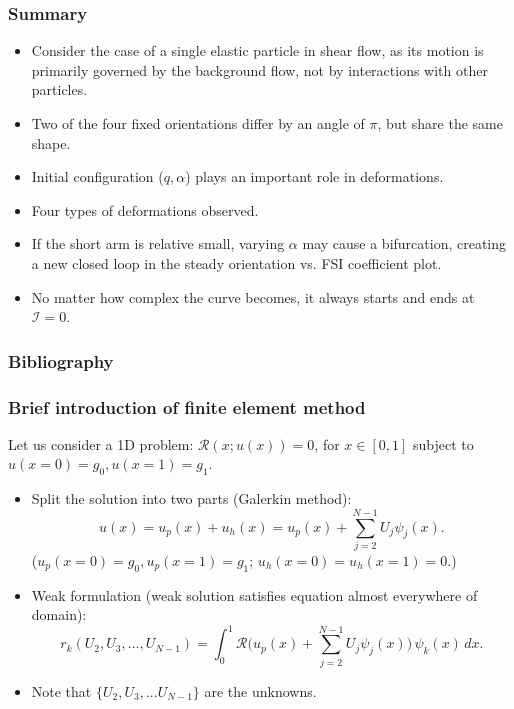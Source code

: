 \documentclass{beamer}
\newcommand{\bi}{\begin{itemize}}
\newcommand{\ei}{\end{itemize}}
\begin{document}


\begin{frame}
	\frametitle{Summary}
	\begin{overlayarea}{\textwidth}{\textheight}
	\bi
	\item Consider the case of a single elastic particle in shear flow, as its motion is primarily governed by the background flow, not by interactions with other particles.
	\item Two of the four fixed orientations differ by an angle of $\pi$, but share the same shape.
	\item Initial configuration ($q,\alpha$) plays an important role in deformations.
	\item Four types of deformations observed.
	\item If the short arm is relative small, varying $\alpha$ may cause a bifurcation, creating a new closed loop in the steady orientation vs. FSI coefficient plot.
	\item No matter how complex the curve becomes, it always starts and ends at $\mathcal{I}=0$.
	\ei
	\end{overlayarea}
\end{frame}

\begin{frame}
\begin{overlayarea}{\textwidth}{\textheight}
	\frametitle{Bibliography}
	\small

\end{overlayarea}
\end{frame}

\begin{frame}
	\frametitle{Brief introduction of finite element method}
	\begin{overlayarea}{\textwidth}{\textheight}
			Let us consider a 1D problem: $\mathcal{R}(x;u(x))=0$, for $ x\in [0,1]$ subject to $u(x=0)=g_0, u(x=1)=g_1$.
			\small\bi
			\item Split the solution into two parts (Galerkin method): \vspace{-0.2cm}$$u(x)=u_p(x)+u_h(x)=u_p(x)+\sum^{N-1}_{j=2}U_j\psi_j(x).$$
			($u_p(x=0)=g_0,u_p(x=1)=g_1$; $u_h(x=0)=u_h(x=1)=0$.)
			\item Weak formulation (weak solution satisfies equation almost everywhere of domain): $$r_k(U_2,U_3,...,U_{N-1})=\int^1_0\mathcal{R}\Bigg(u_p(x)+\sum^{N-1}_{j=2}U_j\psi_j(x)\Bigg)\,\psi_k(x)\,dx.$$
			\item Note that $\{U_2,U_3,...U_{N-1}\}$ are the unknowns. 
			\ei
			
			
			
		\end{overlayarea}
	\end{frame}
	
\end{document}
